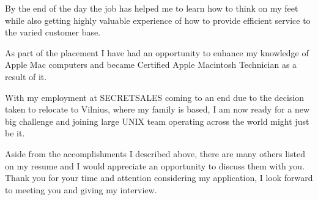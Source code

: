 \documentclass[11pt,a4paper,sans]{moderncv}        %
\begin{document}
By the end of the day the job has helped me to learn how to think on my feet while also getting highly valuable experience of how to provide efficient service to the varied customer base. 

As part of the placement I have had an opportunity to enhance my knowledge of Apple Mac computers and became Certified Apple Macintosh Technician as a result of it.

With my employment at SECRETSALES coming to an end due to the decision taken to relocate to Vilnius, where my family is based, I am now ready for a new big challenge and joining large UNIX team operating across the world might just be it.

Aside from the accomplishments I described above, there are many others listed on my resume and I would appreciate an opportunity to discuss them with you.
Thank you for your time and attention considering my application, I look forward to meeting you and giving my interview.

\makeletterclosing
\end{document}
